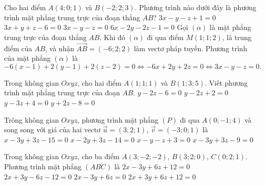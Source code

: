 \begin{ex}%
	Cho hai điểm $A(4;0;1)$ và $B(-2;2;3)$. Phương trình nào dưới đây là phương trình mặt phẳng trung trực của đoạn thẳng $AB$?
	\choice
	{$3x-y-z+1=0$}
	{$3x+y+z-6=0$}
	{\True $3x-y-z=0$}
	{$6x-2y-2z-1=0$}
	\loigiai
	{
		Gọi $(\alpha)$ là mặt phẳng trung trực của đoạn thẳng $AB$. Khi đó $(\alpha)$ đi qua điểm $M(1;1;2)$, là trung điểm của $AB$, và nhận $\overrightarrow{AB}=(-6;2;2)$ làm vectơ pháp tuyến. Phương trình của mặt phẳng $(\alpha)$ là
		$$-6(x-1)+2(y-1)+2(z-2)=0 \Leftrightarrow -6x+2y+2z=0 \Leftrightarrow 3x-y-z=0.$$
	}
\end{ex}
\begin{ex}
	Trong không gian $Oxyz$, cho hai điểm $A(1;1;1)$ và $B(1;3;5)$. Viết phương trình mặt phẳng trung trực của đoạn $AB$.
	\choice
	{$y-2z-6=0$}
	{$y-2z+2=0$}
	{$y-3z+4=0$}
	{\True $y+2z-8=0$}
\end{ex}

\begin{ex}%
	Trông không gian $Oxyz$, phương trình mặt phẳng $(P)$ đi qua $A(0;-1;4)$ và song song với giá của hai vectơ $\vec{u}=(3;2;1)$, $\vec{v}=(-3;0;1)$ là
	\choice
	{\True $x-3y+3z-15=0$}
	{$x-2y+3z-14=0$}
	{$x-y-z+3=0$}
	{$x-3y+3z-9=0$}
\end{ex}

\begin{ex}
	Trong không gian $Oxyz$, cho ba điểm $A(3;-2;-2)$, $B(3;2;0)$, $C(0;2;1)$. Phương trình mặt phẳng $(ABC)$ là
	\choice
	{$2x-3y+6z+12=0$}
	{$2x+3y-6z-12=0$}
	{\True $2x-3y+6z=0$}
	{$2x+3y+6z+12=0$}
\end{ex}

